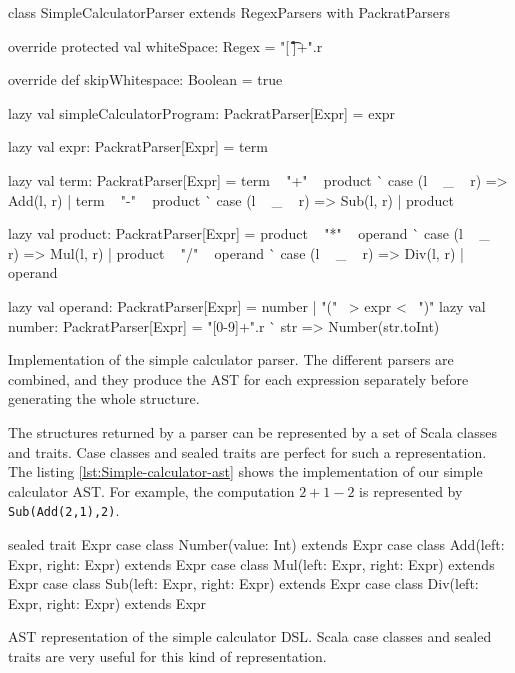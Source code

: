 \begin{listing}[ht]
\centering
\begin{scalacode}
class SimpleCalculatorParser extends RegexParsers with PackratParsers {
  override protected val whiteSpace: Regex = "[ \t\r\f\n]+".r

  override def skipWhitespace: Boolean = true

  lazy val simpleCalculatorProgram: PackratParser[Expr] = expr

  lazy val expr: PackratParser[Expr] = term

  lazy val term: PackratParser[Expr] = {
    term ~ "+" ~ product ^^ { case (l ~ _ ~ r) => Add(l, r) } |
      term ~ "-" ~ product ^^ { case (l ~ _ ~ r) => Sub(l, r) } |
      product
  }

  lazy val product: PackratParser[Expr] = {
    product ~ "*" ~ operand ^^ { case (l ~ _ ~ r) => Mul(l, r) } |
      product ~ "/" ~ operand ^^ { case (l ~ _ ~ r) => Div(l, r) } |
      operand
  }

  lazy val operand: PackratParser[Expr] = number | "(" ~> expr <~ ")"
  lazy val number: PackratParser[Expr] = "[0-9]+".r ^^ { str => Number(str.toInt) }
}
\end{scalacode}
\caption[Implementation of the simple calculator parser]{Implementation of the
simple calculator parser. The different parsers are combined, and they produce
the \gls{AST} for each expression separately before generating the whole structure.}
\label{lst:Simple-calculator-parser}
\end{listing}

The structures returned by a parser can be represented by a set of Scala classes
and traits. Case classes and sealed traits are perfect for such a
representation. The listing \ref{lst:Simple-calculator-ast} shows the
implementation of our simple calculator \gls{AST}. For example, the computation
$2 + 1 - 2$ is represented by \verb|Sub(Add(2,1),2)|.

\begin{listing}[ht]
\centering
\begin{scalacode}
sealed trait Expr
case class Number(value: Int) extends Expr
case class Add(left: Expr, right: Expr) extends Expr
case class Mul(left: Expr, right: Expr) extends Expr
case class Sub(left: Expr, right: Expr) extends Expr
case class Div(left: Expr, right: Expr) extends Expr
\end{scalacode}
\caption[\gls{AST} representation of the simple calculator \gls{DSL}]{\gls{AST}
representation of the simple calculator \gls{DSL}. Scala case classes and sealed
traits are very useful for this kind of representation.}
\label{lst:Simple-calculator-ast}
\end{listing}

